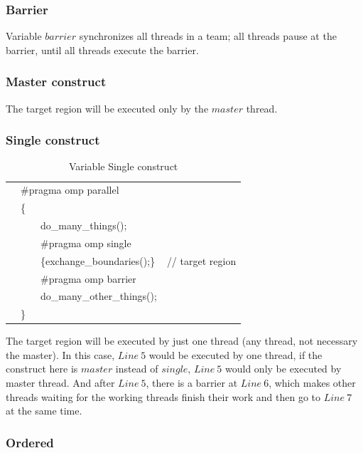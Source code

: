\documentclass[twoside]{article}
\newcounter{magicrownumbers}
\newcommand\rownumber{\stepcounter{magicrownumbers}\arabic{magicrownumbers}}
\begin{document}
\subsubsection{Barrier}

Variable $barrier$ synchronizes all threads in a team; all threads pause at the barrier, until all threads execute the barrier.

\subsubsection{Master construct}

The target region will be executed only by the $master$ thread.

\subsubsection{Single construct}
\begin{table}[!ht]
    \centering
    \begin{tabular}{l  l  l }
    \hline
        \rownumber & {\color{red}$\#$pragma omp parallel} \\ 
        \rownumber & \{ \\ 
        \rownumber & \ \ \ \ do\_many\_things();  \\ 
        \rownumber & \ \ \ \ {\color{red}$\#$pragma omp single} \\ 
        \rownumber & \ \ \ \ \{exchange\_boundaries();\} & // target region \\ 
        \rownumber & \ \ \ \ {\color{red}$\#$pragma omp barrier } \\ 
        \rownumber & \ \ \ \ do\_many\_other\_things();  \\ 
        \rownumber & \} \\
        \hline
    \end{tabular}
    \caption*{Variable Single construct}
\end{table}
\setcounter{magicrownumbers}{0}
The target region will be executed by just one thread (any thread, not necessary the master). In this case, $Line\ 5$ would be executed by one thread, if the construct here is $master$ instead of $single$, $Line\ 5$ would only be executed by master thread. And after $Line\ 5$, there is a barrier at $Line\ 6$, which makes other threads waiting for the working threads finish their work and then go to $Line\ 7$ at the same time.

\subsubsection{Ordered}
\end{document}

